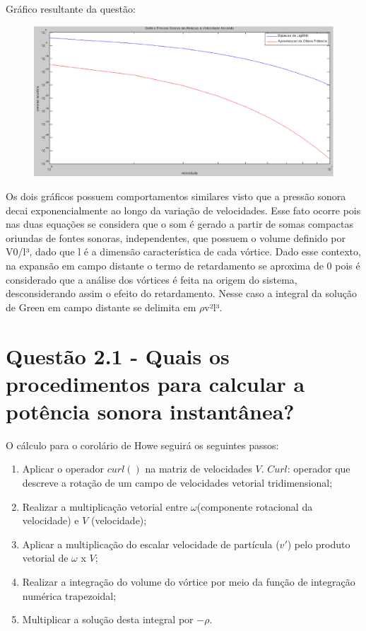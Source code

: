  Gráfico resultante da questão:
 \begin{figure}[h]
	\centering
		\includegraphics[keepaspectratio=true,scale=0.4]{figuras/pressao_velocidade.eps}
	\end{figure}			

 Os dois gráficos possuem comportamentos similares visto que a pressão sonora decai exponencialmente ao longo
 da variação de velocidades. Esse fato ocorre pois nas duas equações se considera que o som é gerado a partir 
 de somas compactas oriundas de fontes sonoras, independentes,
 que possuem o volume definido por V0/l³, dado que l é a dimensão característica de cada vórtice.
 Dado esse contexto, na expansão em campo distante o termo de retardamento se aproxima de 0 pois é considerado
 que a análise dos vórtices é feita na origem do sistema, desconsiderando assim o efeito do retardamento. Nesse caso
 a integral da solução de Green em campo distante se delimita em $\rho$v²l³.

 \section{Questão 2.1 - Quais os procedimentos para calcular a potência sonora instantânea?}

 O cálculo para o corolário de Howe seguirá os seguintes passos:
 \begin{enumerate}
 		\item Aplicar o operador $curl()$ na matriz de velocidades $V$. $Curl$: operador que descreve a rotação de um campo de velocidades vetorial tridimensional;
 		\item Realizar a multiplicação vetorial entre $\omega$(componente rotacional da velocidade) e $V$ (velocidade);
 		\item Aplicar a multiplicação do escalar velocidade de partícula ($v'$) pelo produto vetorial de $\omega$ x $V$;
 		\item Realizar a integração do volume do vórtice por meio da função de integração numérica trapezoidal;
 		\item Multiplicar a solução desta integral por $-\rho$.
 \end{enumerate}

